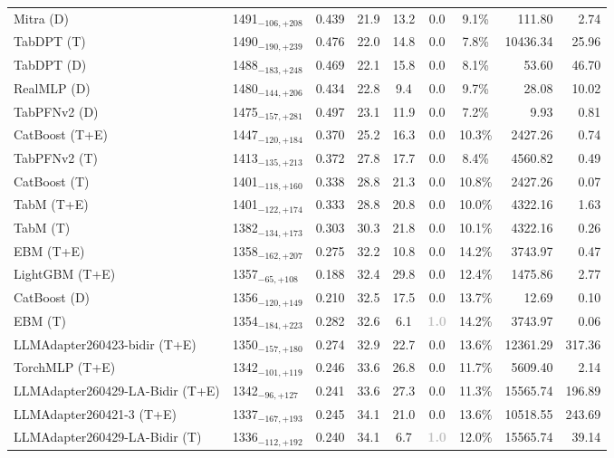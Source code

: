 \begin{tabular}{llcccccrr}
Mitra (D) & 1491${}_{-106,+208}$ & 0.439 & 21.9 & 13.2 & 0.0 & 9.1\% & 111.80 & 2.74 \\
TabDPT (T) & 1490${}_{-190,+239}$ & 0.476 & 22.0 & 14.8 & 0.0 & 7.8\% & 10436.34 & 25.96 \\
TabDPT (D) & 1488${}_{-183,+248}$ & 0.469 & 22.1 & 15.8 & 0.0 & 8.1\% & 53.60 & 46.70 \\
RealMLP (D) & 1480${}_{-144,+206}$ & 0.434 & 22.8 & 9.4 & 0.0 & 9.7\% & 28.08 & 10.02 \\
TabPFNv2 (D) & 1475${}_{-157,+281}$ & 0.497 & 23.1 & 11.9 & 0.0 & 7.2\% & 9.93 & 0.81 \\
CatBoost (T+E) & 1447${}_{-120,+184}$ & 0.370 & 25.2 & 16.3 & 0.0 & 10.3\% & 2427.26 & 0.74 \\
TabPFNv2 (T) & 1413${}_{-135,+213}$ & 0.372 & 27.8 & 17.7 & 0.0 & 8.4\% & 4560.82 & 0.49 \\
CatBoost (T) & 1401${}_{-118,+160}$ & 0.338 & 28.8 & 21.3 & 0.0 & 10.8\% & 2427.26 & 0.07 \\
TabM (T+E) & 1401${}_{-122,+174}$ & 0.333 & 28.8 & 20.8 & 0.0 & 10.0\% & 4322.16 & 1.63 \\
TabM (T) & 1382${}_{-134,+173}$ & 0.303 & 30.3 & 21.8 & 0.0 & 10.1\% & 4322.16 & 0.26 \\
EBM (T+E) & 1358${}_{-162,+207}$ & 0.275 & 32.2 & 10.8 & 0.0 & 14.2\% & 3743.97 & 0.47 \\
LightGBM (T+E) & 1357${}_{-65,+108}$ & 0.188 & 32.4 & 29.8 & 0.0 & 12.4\% & 1475.86 & 2.77 \\
CatBoost (D) & 1356${}_{-120,+149}$ & 0.210 & 32.5 & 17.5 & 0.0 & 13.7\% & 12.69 & 0.10 \\
EBM (T) & 1354${}_{-184,+223}$ & 0.282 & 32.6 & 6.1 & \textcolor{silver}{\textbf{1.0}} & 14.2\% & 3743.97 & 0.06 \\
LLMAdapter260423-bidir (T+E) & 1350${}_{-157,+180}$ & 0.274 & 32.9 & 22.7 & 0.0 & 13.6\% & 12361.29 & 317.36 \\
TorchMLP (T+E) & 1342${}_{-101,+119}$ & 0.246 & 33.6 & 26.8 & 0.0 & 11.7\% & 5609.40 & 2.14 \\
LLMAdapter260429-LA-Bidir (T+E) & 1342${}_{-96,+127}$ & 0.241 & 33.6 & 27.3 & 0.0 & 11.3\% & 15565.74 & 196.89 \\
LLMAdapter260421-3 (T+E) & 1337${}_{-167,+193}$ & 0.245 & 34.1 & 21.0 & 0.0 & 13.6\% & 10518.55 & 243.69 \\
LLMAdapter260429-LA-Bidir (T) & 1336${}_{-112,+192}$ & 0.240 & 34.1 & 6.7 & \textcolor{silver}{\textbf{1.0}} & 12.0\% & 15565.74 & 39.14 \\

\end{tabular}
